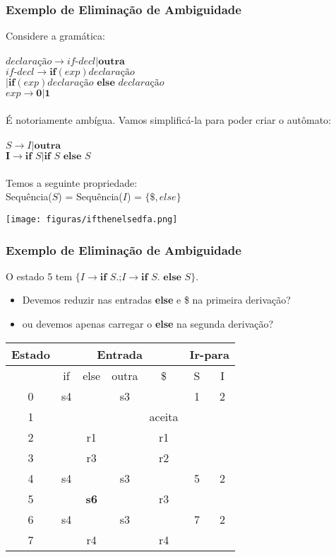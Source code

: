 \documentclass[table]{beamer}
\begin{document}
\begin{frame}
   \frametitle{Exemplo de Eliminação de Ambiguidade}
   Considere a gramática: \\
   \\
   $\textit{declaração}\to \textit{if-decl}|\textbf{outra}$ \\
   $\textit{if-decl} \to \textbf{if}(exp) \textit{declaração}$ \\
   $|\textbf{if}(exp)\textit{declaração }\textbf{else }\textit{declaração}$ \\
   $exp\to\textbf{0}|\textbf{1}$ \\
   \\
   É notoriamente ambígua. Vamos simplificá-la para poder criar o autômato: \\
   \\
   $S\to I|\textbf{outra}$ \\
   $\textbf{I}\to\textbf{if }S|\textbf{if }S\textbf{ else }S$ \\
   \\
   Temos a seguinte propriedade: \\
   Sequência($S$) = Sequência($I$) = $\{\$, else\}$
\end{frame}

\begin{frame}
   \texttt{[image: figuras/ifthenelsedfa.png]}
\end{frame}

\begin{frame}
   \frametitle{Exemplo de Eliminação de Ambiguidade}
   O estado 5 tem $\{I\to\textbf{if }S.\text{;}I\to\textbf{if }S.\textbf{ else }S\}$.
   \begin{itemize}
      \item Devemos reduzir nas entradas \textbf{else} e \$ na primeira derivação?
      \item ou devemos  apenas carregar o \textbf{else} na segunda derivação?
   \end{itemize}
   \begin{table}
      \begin{tabular}{|c|c|c|c|c|c|c|}
      \hline
      \textbf{Estado} & \multicolumn{4}{c|}{\textbf{Entrada}} & \multicolumn{2}{c|}{\textbf{Ir-para}} \\
      \hline 
       & if & else & outra & \$ & S & I \\
       \hline
       0 & s4 &    & s3 &        & 1 & 2 \\
       1 &    &    &    & aceita &   &   \\
       2 &    & r1 &    & r1     &   &   \\
       3 &    & r3 &    & r2     &   &   \\
       4 & s4 &    & s3 &        & 5 & 2 \\
       5 &    & \textbf{s6} &    & r3     &   &   \\
       6 & s4 &    & s3 &        & 7 & 2 \\
       7 &    & r4 &    & r4     &   &   \\
      \hline
      \end{tabular}
   \end{table}
\end{frame}
\end{document}
